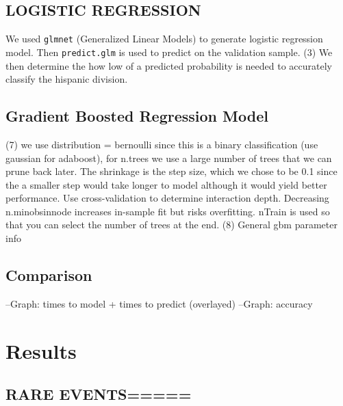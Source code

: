 \documentclass[a4paper]{article}
\begin{document}
\begin{multicols}{2}
\subsection*{LOGISTIC REGRESSION}
We used \texttt{glmnet} (Generalized Linear Models) to generate logistic regression model.
Then \texttt{predict.glm} is used to predict on the validation sample.
(3) We then determine the how low of a predicted probability is needed to accurately classify the hispanic division.
\subsection*{Gradient Boosted Regression Model}
(7) we use distribution = bernoulli since this is a binary classification (use gaussian for adaboost), for n.trees we use a large number of trees that we can prune back later. The shrinkage is the step size, which we chose to be 0.1 since the a smaller step would take longer to model although it would yield better performance. Use cross-validation to determine interaction depth. Decreasing n.minobsinnode increases in-sample fit but risks overfitting. nTrain is used so that you can select the number of trees at the end.
(8) General gbm parameter info
\subsection*{Comparison}
--Graph: times to model + times to predict (overlayed)
--Graph: accuracy





\section*{Results}
\subsection*{RARE EVENTS=====}





\end{multicols}
\end{document}

